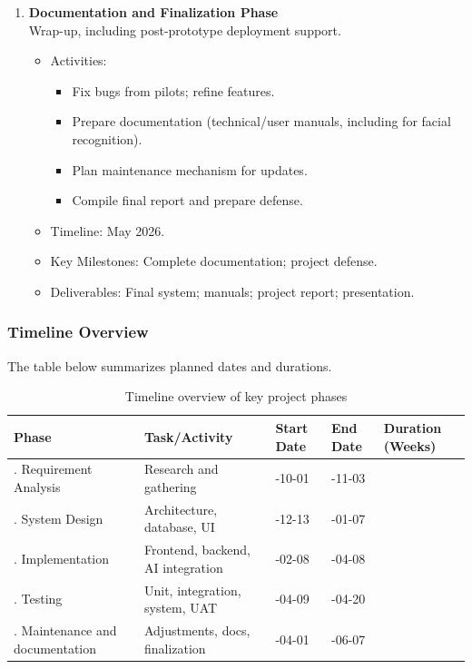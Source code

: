 \begin{enumerate}[leftmargin=*,label=\textbf{\arabic*.}]
    \item \textbf{Documentation and Finalization Phase}\\
    Wrap-up, including post-prototype deployment support.
    \begin{itemize}[leftmargin=1.6em]
        \item Activities:
        \begin{itemize}[leftmargin=1.4em]
            \item Fix bugs from pilots; refine features.
            \item Prepare documentation (technical/user manuals, including for facial recognition).
            \item Plan maintenance mechanism for updates.
            \item Compile final report and prepare defense.
        \end{itemize}
        \item Timeline: May 2026.
        \item Key Milestones: Complete documentation; project defense.
        \item Deliverables: Final system; manuals; project report; presentation.
    \end{itemize}
\end{enumerate}

\subsubsection{Timeline Overview}
The table below summarizes planned dates and durations.

\begin{table}[ht]
\centering
\renewcommand{\arraystretch}{1.2}
{\small
\setlength{\tabcolsep}{4pt}
\begin{tabular}{|>{\raggedright\arraybackslash}p{2.6cm}|>{\raggedright\arraybackslash}p{4.0cm}|>{\centering\arraybackslash}p{1.9cm}|>{\centering\arraybackslash}p{1.9cm}|>{\centering\arraybackslash}p{1.9cm}|}
\hline
\textbf{Phase} & \textbf{Task/Activity} & \textbf{Start Date} & \textbf{End Date} & \textbf{Duration (Weeks)} \\
\hline
1. Requirement Analysis & Research and gathering & 2025-10-01 & 2025-11-03 & 4 \\
\hline
2. System Design & Architecture, database, UI & 2025-12-13 & 2026-01-07 & 3 \\
\hline
3. Implementation & Frontend, backend, AI integration & 2025-02-08 & 2026-04-08 & 9 \\
\hline
4. Testing & Unit, integration, system, UAT & 2026-04-09 & 2026-04-20 & 2 \\
\hline
5. Maintenance and documentation & Adjustments, docs, finalization & 2026-04-01 & 2026-06-07 & 9 \\
\hline
\end{tabular}
}
\caption{Timeline overview of key project phases}
\label{tab:timeline-overview}
\end{table}

